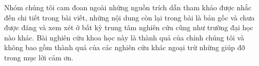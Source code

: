 
\begin{declaration}

Nhóm chúng tôi cam đoan ngoài những nguồn trích dẫn tham khảo được nhắc đến chi tiết trong bài viết, những nội dung còn lại trong bài là bản gốc và chưa được đăng và xem xét ở bất kỳ trung tâm nghiên cứu cũng như trường đại học nào khác. Bài nghiên cứu khoa học này là thành quả của chính chúng tôi và không bao gồm thành quả của các nghiên cứu khác ngoại trừ những giúp đỡ trong mục lời cảm ơn.

\end{declaration}

